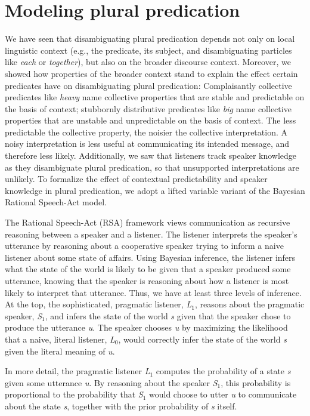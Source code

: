 \documentclass[linguex]{sp}
\begin{document}
\section{Modeling plural predication}

We have seen that disambiguating plural predication depends not only on local linguistic context (e.g., the predicate, its subject, and disambiguating particles like \emph{each} or \emph{together}), but also on the broader discourse context. Moreover, we showed how properties of the broader context stand to explain the effect certain predicates have on disambiguating plural predication: Complaisantly collective predicates like \emph{heavy} name collective properties that are stable and predictable on the basis of context; stubbornly distributive predicates like \emph{big} name collective properties that are unstable and unpredictable on the basis of context. The less predictable the collective property, the noisier the collective interpretation. A noisy interpretation is less useful at communicating its intended message, and therefore less likely. Additionally, we saw that listeners track speaker knowledge as they disambiguate plural predication, so that unsupported interpretations are unlikely. To formalize the effect of contextual predictability and speaker knowledge in plural predication, we adopt a lifted variable variant of the Bayesian Rational Speech-Act model. 

The Rational Speech-Act (RSA) framework views communication as recursive reasoning between a speaker and a listener. The listener interprets the speaker's utterance by reasoning about a cooperative speaker trying to inform a naive listener about some state of affairs. Using Bayesian inference, the listener infers what the state of the world is likely to be given that a speaker produced some utterance, knowing that the speaker is reasoning about how a listener is most likely to interpret that utterance. Thus, we have at least three levels of inference. At the top, the sophisticated, pragmatic listener, \emph{L}$_{1}$, reasons about the pragmatic speaker, \emph{S}$_{1}$, and infers the state of the world \emph{s} given that the speaker chose to produce the utterance \emph{u}. The speaker chooses \emph{u} by maximizing the likelihood that a naive, literal listener, \emph{L}$_{0}$, would correctly infer the state of the world \emph{s} given the literal meaning of \emph{u}.

In more detail, the pragmatic listener \emph{L}$_{1}$ computes the probability of a state \emph{s} given some utterance \emph{u}. By reasoning about the speaker \emph{S}$_{1}$, this probability is proportional to the probability that \emph{S}$_{1}$ would choose to utter \emph{u} to communicate about the state \emph{s}, together with the prior probability of \emph{s} itself.
\end{document}
